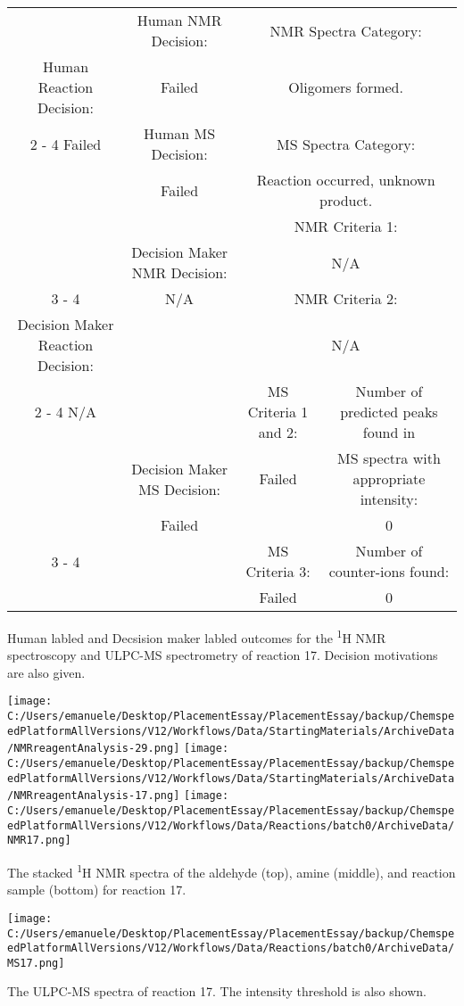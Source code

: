 \documentclass{article}%
\begin{document}
\begin{Decision Table}[H]%
\begin{tabular}{|c|c|c|c|}%
\hline%
&Human NMR Decision:&\multicolumn{2}{|c|}{NMR Spectra Category:}\\%
Human Reaction Decision:&Failed&\multicolumn{2}{|c|}{Oligomers formed.}\\%
\cline{2%
-%
4}%
Failed&Human MS Decision:&\multicolumn{2}{|c|}{MS Spectra Category:}\\%
&Failed&\multicolumn{2}{|c|}{Reaction occurred, unknown product.}\\%
\hline%
&&\multicolumn{2}{|c|}{NMR Criteria 1:}\\%
&Decision Maker NMR Decision:&\multicolumn{2}{|c|}{N/A}\\%
\cline{3%
-%
4}%
&N/A&\multicolumn{2}{|c|}{NMR Criteria 2:}\\%
Decision Maker Reaction Decision:&&\multicolumn{2}{|c|}{N/A}\\%
\cline{2%
-%
4}%
N/A&&MS Criteria 1 and 2:&Number of predicted peaks found in\\%
&Decision Maker MS Decision:&Failed&MS spectra with appropriate intensity:\\%
&Failed&&0\\%
\cline{3%
-%
4}%
&&MS Criteria 3:&Number of counter{-}ions found:\\%
&&Failed&0\\%
\hline%
\end{tabular}%
\caption{Human labled and Decsision maker labled outcomes for the \textsuperscript{1}H NMR spectroscopy and ULPC-MS spectrometry of reaction 17. Decision motivations are also given.}%
\end{Decision Table}%
\begin{NMR Spectra}[H]%
\begin{center}%
\texttt{[image: C:/Users/emanuele/Desktop/PlacementEssay/PlacementEssay/backup/ChemspeedPlatformAllVersions/V12/Workflows/Data/StartingMaterials/ArchiveData/NMRreagentAnalysis-29.png]}\hfill%
\texttt{[image: C:/Users/emanuele/Desktop/PlacementEssay/PlacementEssay/backup/ChemspeedPlatformAllVersions/V12/Workflows/Data/StartingMaterials/ArchiveData/NMRreagentAnalysis-17.png]}\hfill%
\texttt{[image: C:/Users/emanuele/Desktop/PlacementEssay/PlacementEssay/backup/ChemspeedPlatformAllVersions/V12/Workflows/Data/Reactions/batch0/ArchiveData/NMR17.png]}\hfill%
\end{center}%
\caption{The stacked \textsuperscript{1}H NMR spectra of the aldehyde (top), amine (middle), and reaction sample (bottom) for reaction 17.}%
\end{NMR Spectra}%
\begin{MS Spectra}[H]%
\begin{center}%
\texttt{[image: C:/Users/emanuele/Desktop/PlacementEssay/PlacementEssay/backup/ChemspeedPlatformAllVersions/V12/Workflows/Data/Reactions/batch0/ArchiveData/MS17.png]}\hfill%
\end{center}%
\caption{The ULPC-MS spectra of reaction 17. The intensity threshold is also shown.}%
\end{MS Spectra}%
\end{document}
